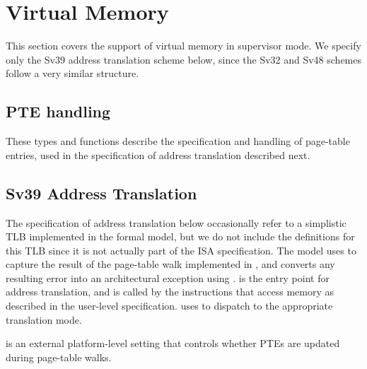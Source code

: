 \begin{formalspec}
  \sailfnexceptionDelegatee
  \sailfntrapHandler
  \sailfnexceptionHandler
  \sailfnhandleMemException
  \sailfnhandleInterrupt
  \sailfnhandleIllegal
\end{formalspec}

\section{Virtual Memory}
\label{s:priv-sail-vmem}

This section covers the support of virtual memory in supervisor mode.
We specify only the Sv39 address translation scheme below, since the
Sv32 and Sv48 schemes follow a very similar structure.

\subsection{PTE handling}
\label{ss:priv-sail-ptes}

These types and functions describe the specification and handling of
page-table entries, used in the specification of address translation
described next.

\begin{formalspec}
  \sailtypepteAttribs
  \sailtypePTEBits
  \sailfnisPTEPtr
  \sailfnisInvalidPTE
  \sailfncheckPTEPermission
  \sailfnupdatePTEBits
\end{formalspec}

\subsection{Sv39 Address Translation}
\label{ss:priv-sail-addr-trans}

The specification of address translation below occasionally refer to a
simplistic TLB implemented in the formal model, but we do not include
the definitions for this TLB since it is not actually part of the ISA
specification.  The model uses  to capture the
result of the page-table walk implemented in , and
converts any resulting error into an architectural exception using
.  is the
entry point for address translation, and is called by the instructions
that access memory as described in the user-level specification.
 uses  to dispatch
to the appropriate translation mode.

 is an external platform-level
setting that controls whether PTEs are updated during page-table
walks.

\begin{formalspec}
  \sailtypePTWError
  \sailtypePTWResult
  \sailfntranslationException
  \sailfnwalkThreeNine
  \sailfntranslateThreeNine
  \sailfntranslationMode
  \sailtypeTRResult
  \sailfntranslateAddr
\end{formalspec}

